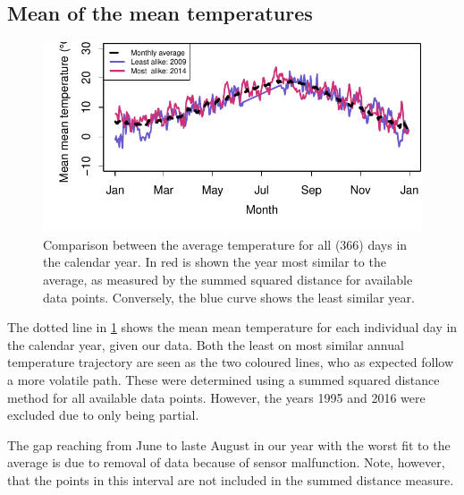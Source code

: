 \documentclass[10pt]{article}\usepackage[]{graphicx}\usepackage[]{color}
\makeatletter
\def\maxwidth{ %
  \ifdim\Gin@nat@width>\linewidth
    \linewidth
  \else
    \Gin@nat@width
  \fi
}
\newenvironment{knitrout}{}{} %
\theoremstyle{plain}
\makeatother
\begin{document}
\subsection{Mean of the mean temperatures}
\begin{knitrout}
\color{fgcolor}\begin{figure}[H]

{\centering \includegraphics[width=\maxwidth]{figure/graphics-compareYears-1} 

}

\caption[Comparison between the average temperature for all (366) days in the calendar year]{Comparison between the average temperature for all (366) days in the calendar year. In red is shown the year most similar to the average, as measured by the summed squared distance for available data points. Conversely, the blue curve shows the least similar year.}\label{fig:compareYears}
\end{figure}


\end{knitrout}
The dotted line in \cref{fig:compareYears} shows the mean mean temperature for each individual day in the calendar year, given our data. Both the least on most similar annual temperature trajectory are seen as the two coloured lines, who as expected follow a more volatile path. These were determined using a summed squared distance method for all available data points. However, the years 1995 and 2016 were excluded due to only being partial.

The gap reaching from June to laste August in our year with the worst fit to the average is due to removal of data because of sensor malfunction. Note, however, that the points in this interval are not included in the summed distance measure. 
\end{document}
